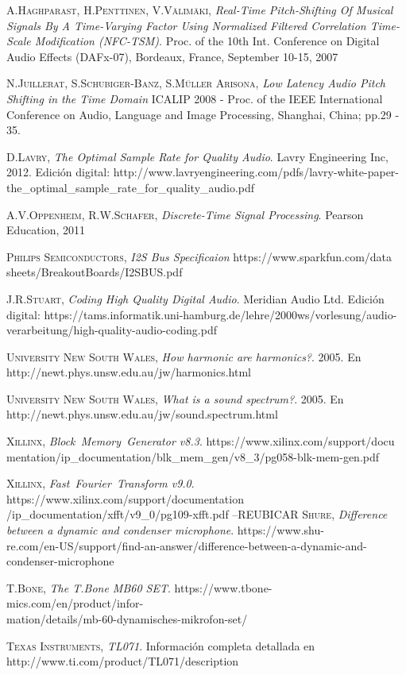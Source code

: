 \documentclass[a4paper, 11pt, oneside, openright]{report}
\begin{document}
\begin{thebibliography}{aa}
	\textsc{A.Haghparast, H.Penttinen, V.Välimäki},
	\textit{Real-Time Pitch-Shifting Of Musical Signals By A Time-Varying Factor Using Normalized Filtered Correlation Time-Scale Modification (NFC-TSM)}.
	Proc. of the 10th Int. Conference on Digital Audio Effects (DAFx-07), Bordeaux, France, September 10-15, 2007
	
	\textsc{N.Juillerat, S.Schubiger-Banz, S.Müller Arisona},
	\textit{Low Latency Audio Pitch Shifting in the Time Domain}
	ICALIP 2008 - Proc. of the IEEE International Conference on Audio, Language and Image Processing, Shanghai, China; pp.29 - 35.
	
	\textsc{D.Lavry},
	\textit{The Optimal Sample Rate for Quality Audio}. Lavry Engineering Inc, 2012. Edición digital: http://www.lavryengineering.com/pdfs/lavry-white-paper-the\_optimal\_sample\_rate\_for\_quality\_audio.pdf
		
	\textsc{A.V.Oppenheim, R.W.Schafer},
	\textit{Discrete-Time Signal Processing}.
	Pearson Education, 2011

	\textsc{Philips Semiconductors},
	\textit{I2S Bus Specificaion}
	https://www.sparkfun.com/data\\sheets/BreakoutBoards/I2SBUS.pdf
	
	\textsc{J.R.Stuart},
	\textit{Coding High Quality Digital Audio}. Meridian Audio Ltd. Edición\\ digital: https://tams.informatik.uni-hamburg.de/lehre/2000ws/vorlesung/audio-\\verarbeitung/high-quality-audio-coding.pdf

	\textsc{University New South Wales},
	\textit{How harmonic are harmonics?}. 2005. En
	http://newt.phys.unsw.edu.au/jw/harmonics.html
	
	\textsc{University New South Wales},
	\textit{What is a sound spectrum?}. 2005. En
	http://newt.phys.unsw.edu.au/jw/sound.spectrum.html
	
	\textsc{Xillinx},
	\textit{Block~Memory~Generator v8.3}. https://www.xilinx.com/support/docu mentation/ip\_documentation/blk\_mem\_gen/v8\_3/pg058-blk-mem-gen.pdf
	
	\textsc{Xillinx},
	\textit{Fast~Fourier~Transform v9.0}. https://www.xilinx.com/support/documentation\\/ip\_documentation/xfft/v9\_0/pg109-xfft.pdf
--REUBICAR
	\textsc{Shure},
	\textit{Difference between a dynamic and condenser microphone}. https://www.shu-\\re.com/en-US/support/find-an-answer/difference-between-a-dynamic-and-condenser-microphone
	
	\textsc{T.Bone},
	\textit{The T.Bone MB60 SET}. https://www.tbone-mics.com/en/product/infor-\\mation/details/mb-60-dynamisches-mikrofon-set/
	
	\textsc{Texas Instruments},
	\textit{TL071}. Información completa detallada en http://www.ti.com/product/TL071/description
\end{thebibliography}
\end{document}
